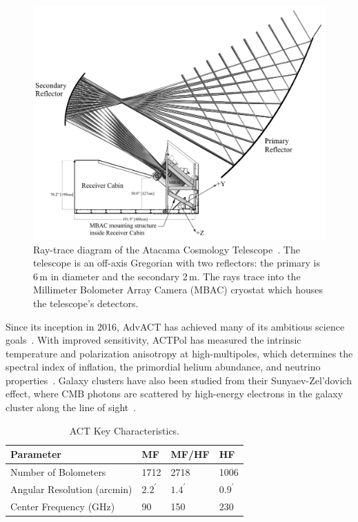 \begin{figure}[t]
    \centering
    \includegraphics[width = \textwidth]{Figures/act_inst.pdf}
    \caption{Ray-trace diagram of the Atacama Cosmology Telescope~\cite{act_inst}.  The telescope is an off-axis Gregorian with two reflectors: the primary is 6\,m in diameter and the secondary 2\,m.  The rays trace into the Millimeter Bolometer Array Camera (MBAC) cryostat which houses the telescope's detectors.}
    \label{fig:act_inst}
\end{figure}

Since its inception in 2016, AdvACT has achieved many of its ambitious science goals~\cite{2016JLTP184772H}.  With improved sensitivity, ACTPol has measured the intrinsic temperature and polarization anisotropy at high-multipoles, which determines the spectral index of inflation, the primordial helium abundance, and neutrino properties~\cite{10.1117/12.857464}.  Galaxy clusters have also been studied from their Sunyaev-Zel’dovich effect, where CMB photons are scattered by high-energy electrons in the galaxy cluster along the line of sight~\cite{weinberg_cosmo}.

\begin{table}[hb]
    \centering
    \begin{tabular}{|l|l|l|l|} \hline
        \textbf{ Parameter} & \textbf{MF}   &  \textbf{MF/HF}  & \textbf{HF}  \\ \hline \hline
        Number of Bolometers & 1712 & 2718 &1006 \\\hline
        Angular Resolution (arcmin) & $2.2^{\prime}$ & $1.4^{\prime}$ & $0.9^{\prime}$ \\\hline
        Center Frequency (GHz) & 90 & 150 & 230\\\hline
    \end{tabular} \caption{ACT Key Characteristics.}
    \label{tab:act}
\end{table}
